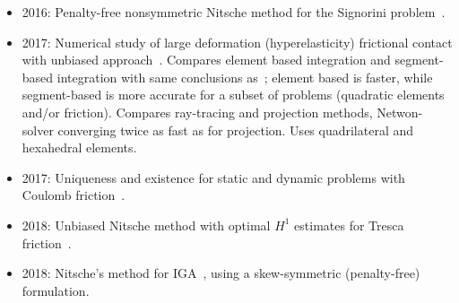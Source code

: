 \documentclass[12pt]{article}
\begin{document}
\begin{itemize}
\item 2016: Penalty-free nonsymmetric Nitsche method for the Signorini problem~\cite{burman2016free}.
\item 2017: Numerical study of large deformation (hyperelasticity) frictional contact with unbiased approach~\cite{MLIKA2017selfcontact}. Compares element based integration and segment-based integration with same conclusions as~\cite{Farah2015integration}; element based is faster, while segment-based is more accurate for a subset of problems (quadratic elements and/or friction).
Compares ray-tracing and projection methods, Netwon-solver converging twice as fast as for projection. Uses quadrilateral and hexahedral elements.
\item 2017: Uniqueness and existence for static and dynamic problems with Coulomb friction~\cite{chouly2017coulomb}.
\item 2018: Unbiased Nitsche method with optimal $H^1$ estimates for Tresca friction~\cite{chouly2018unbiased}.
\item 2018: Nitsche's method for IGA~\cite{HU2018IGA}, using a skew-symmetric (penalty-free) formulation.
\end{itemize}



\printbibliography
\end{document}
